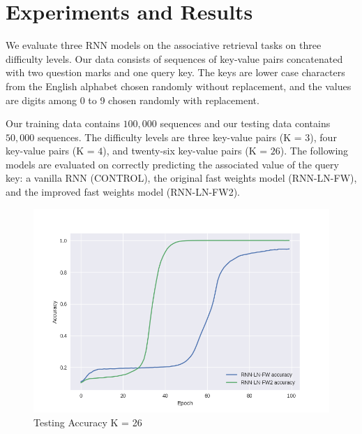 \documentclass[10pt,letterpaper]{article}
\begin{document}
\section{Experiments and Results}
We evaluate three RNN models on the associative retrieval tasks on three difficulty levels.
Our data consists of sequences of key-value pairs concatenated with two question marks and one query key.
The keys are lower case characters from the English alphabet chosen randomly without replacement, and the values are digits among 0 to 9 chosen randomly with replacement.

Our training data contains $100,000$ sequences and our testing data contains $50,000$ sequences.
The difficulty levels are three key-value pairs (K = $3$), four key-value pairs (K = $4$), and twenty-six key-value pairs (K = $26$).
The following models are evaluated on correctly predicting the associated value of the query key: a vanilla RNN (CONTROL), the original fast weights model (RNN-LN-FW), and the improved fast weights model (RNN-LN-FW2).

\begin{table}[h!]
\centering
\vskip -0.12in
\caption{Testing Accuracy of Different Models}
\vskip 0.12in
\label{table:compare_methods}
\end{table}

\begin{figure}[h]
\vskip -0.30in
  \centering
  \includegraphics[width=\columnwidth]{k26}
  \vskip -0.06in
  \caption{Testing Accuracy K = 26}
  \label{fig:tea}
\end{figure}
\end{document}
